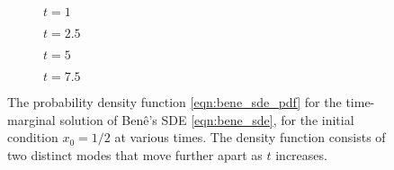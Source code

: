 \begin{figure}
	\begin{center}
		\begin{subfigure}{0.49\textwidth}
			\caption{\(t = 1\)}
			\label{fig:bene_1}
		\end{subfigure}
		\begin{subfigure}{0.49\textwidth}
			\caption{\(t = 2.5\)}
			\label{fig:bene_2.5}
		\end{subfigure}
		\begin{subfigure}{0.49\textwidth}
			\caption{\(t = 5\)}
			\label{fig:bene_5}
		\end{subfigure}
		\begin{subfigure}{0.49\textwidth}
			\caption{\(t = 7.5\)}
			\label{fig:bene_7.5}
		\end{subfigure}
	\end{center}
	\caption{The probability density function \cref{eqn:bene_sde_pdf} for the time-marginal solution of Ben\^e's SDE \cref{eqn:bene_sde}, for the initial condition \(x_0 = 1/2\) at various times.
		The density function consists of two distinct modes that move further apart as \(t\) increases.}
	\label{fig:bene_pdf}
\end{figure}



